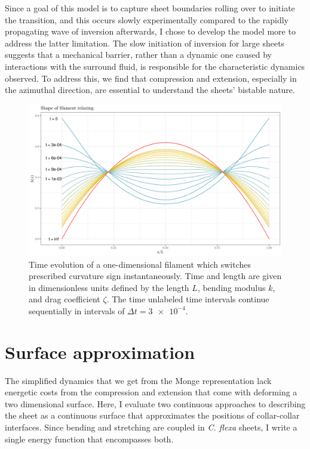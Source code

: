 Since a goal of this model is to capture sheet boundaries rolling over to initiate the transition, and this occurs slowly experimentally compared to the rapidly propagating wave of inversion afterwards, I chose to develop the model more to address the latter limitation.
The slow initiation of inversion for large sheets suggests that a mechanical barrier, rather than a dynamic one caused by interactions with the surround fluid, is responsible for the characteristic dynamics observed.
To address this, we find that compression and extension, especially in the azimuthal direction, are essential to understand the sheets' bistable nature.

\begin{figure}[bthp]
    \centering
    \includegraphics[width=\textwidth]{shapes.png}
    \caption[Dynamics of a one-dimensional filament model]{Time evolution of a one-dimensional filament which switches prescribed curvature sign instantaneously. Time and length are given in dimensionless units defined by the length $L$, bending modulus $k$, and drag coefficient $\zeta$. The time unlabeled time intervals continue sequentially in intervals of $\Delta t = \num{3e-4}$.}
    \label{fig:shapes}
\end{figure}

\section{Surface approximation} \label{sec:surface_approx}

The simplified dynamics that we get from the Monge representation lack energetic costs from the compression and extension that come with deforming a two dimensional surface. 
Here, I evaluate two continuous approaches to describing the sheet as a continuous surface that approximates the positions of collar-collar interfaces.
Since bending and stretching are coupled in \textit{C. flexa} sheets, I write a single energy function that encompasses both.

